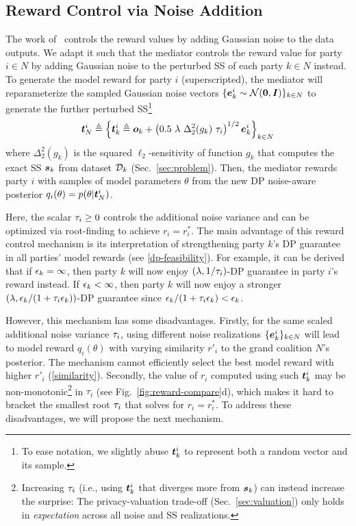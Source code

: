 \documentclass{article}
\theoremstyle{plain}
\theoremstyle{definition}
\theoremstyle{remark}
\renewcommand{\citet}[1]{\cite{#1}}
\begin{document}
\subsection{Reward Control via Noise Addition}
\label{sec:strengthen}%
The work of~\citet{simcollaborative} controls the reward values by adding Gaussian noise to the data outputs. We adapt it such that the mediator controls the reward value for party $i \in N$ by adding Gaussian noise to the perturbed SS of each party $k \in N$ instead. 
To generate the model reward for party $i$ (superscripted), the mediator will reparameterize the sampled Gaussian noise vectors $\{{\bm{e}}^i_k \sim \mathcal{N}(\mathbf{0}, {\bm{I}})\}_{k \in N}$ to generate the further perturbed SS\footnote{
To ease notation, 
we slightly abuse ${\bm{t}}_k^i$ to represent both a random vector and its sample.}
\begin{equation*}
\vt^i_N \triangleq \left\{ \vt_k^i \triangleq \vo_k  + \left(0.5\ \lambda\  \Delta_2^2(g_k) \ \tau_i\right)^{1/2}\ve^i_k  \right\}_{k \in N}%
\end{equation*}
where $\Delta_2^2(g_k)$ is the squared $\ell_2$-sensitivity of function $g_k$ that computes the exact SS ${\bm{s}}_k$ from dataset ${\mathcal{D}}_k$ (Sec.~\ref{sec:problem}). Then, the mediator rewards party $i$ with samples of model parameters $\theta$ from the new DP noise-aware posterior $q_i(\theta) = p(\theta|{\bm{t}}^i_N)$.

Here, the scalar ${\tau_i} \geq 0$ controls the additional noise variance and can be optimized via root-finding to achieve $r_i = r^*_i$. The main advantage of this reward control mechanism is its interpretation of strengthening party $k$'s DP guarantee in all parties' model rewards (see \ref{dp-feasibility}). For example, it can be derived that if ${\epsilon}_k = \infty$, then party $k$ will now enjoy $(\lambda, 1/ {\tau_i})$-DP guarantee in party $i$'s reward instead. If ${\epsilon}_k < \infty$, then party $k$ will now enjoy a stronger $(\lambda, {\epsilon}_k/(1+{\tau_i} {\epsilon}_k))$-DP guarantee since ${\epsilon}_k/(1+{\tau_i} {\epsilon}_k) < {\epsilon}_k$. %

However, this mechanism has some disadvantages. 
Firstly, for the same scaled additional noise variance ${\tau_i}$, using different noise realizations $\{{\bm{e}}^i_k\}_{k \in N}$ will lead to model reward $q_i(\theta)$ with varying similarity $r'_i$ to the grand coalition $N$'s posterior. The mechanism cannot efficiently select the best model reward with higher $r'_i$ (\ref{similarity}).
Secondly, the value of $r_i$ computed using such ${\bm{t}}^i_k$ may be non-monotonic\footnote{Increasing ${\tau_i}$ (i.e., using ${\bm{t}}^i_k$ that diverges more from ${\bm{s}}_k$) can instead increase the surprise: The privacy-valuation trade-off  (Sec.~\ref{sec:valuation}) only holds in \emph{expectation} across all noise and SS realizations.} in $\tau_i$ (see Fig.~\ref{fig:reward-compare}d), which makes it hard to bracket the smallest root ${\tau_i}$ that solves for $r_i =  r^*_i$. 
To address these disadvantages, we will propose the next mechanism.%
\end{document}
